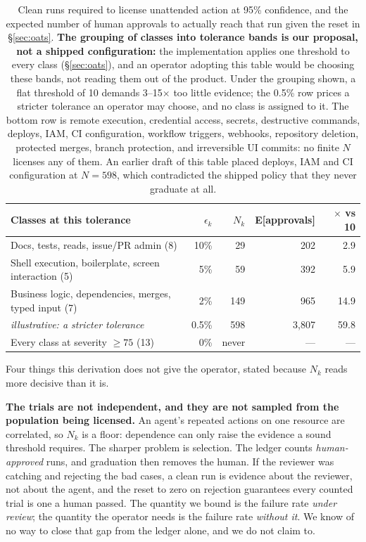 \documentclass[10pt]{article}
\begin{document}
\begin{table}[H]
\centering
\begin{tabular}{lrrrr}
\toprule
Classes at this tolerance & $\epsilon_k$ & $N_k$ & E[approvals] & $\times$ vs 10 \\
\midrule
Docs, tests, reads, issue/PR admin (8) & 10\% & 29 & 202 & 2.9 \\
Shell execution, boilerplate, screen interaction (5) & 5\% & 59 & 392 & 5.9 \\
Business logic, dependencies, merges, typed input (7) & 2\% & 149 & 965 & 14.9 \\
\emph{illustrative: a stricter tolerance} & 0.5\% & 598 & 3{,}807 & 59.8 \\
\midrule
Every class at severity $\geq 75$ (13) & 0\% & never & --- & --- \\
\bottomrule
\end{tabular}
\caption{Clean runs required to license unattended action at 95\% confidence, and the
expected number of human approvals to actually reach that run given the reset in
\S\ref{sec:oats}. \textbf{The grouping of classes into tolerance bands is our
proposal, not a shipped configuration:} the implementation applies one threshold to
every class (\S\ref{sec:oats}), and an operator adopting this table would be choosing
these bands, not reading them out of the product. Under the grouping shown, a flat
threshold of 10 demands 3--15$\times$ too little evidence; the 0.5\% row prices a
stricter tolerance an operator may choose, and no class is assigned to it. The bottom
row is remote execution, credential access, secrets, destructive commands, deploys,
IAM, CI configuration, workflow triggers, webhooks, repository deletion, protected
merges, branch protection, and irreversible UI commits: no finite $N$ licenses any of
them. An earlier draft of this table placed deploys, IAM and CI configuration at
$N=598$, which contradicted the shipped policy that they never graduate at all.}
\end{table}

Four things this derivation does not give the operator, stated because $N_k$ reads
more decisive than it is.

\textbf{The trials are not independent, and they are not sampled from the population
being licensed.} An agent's repeated actions on one resource are correlated, so $N_k$
is a floor: dependence can only raise the evidence a sound threshold requires. The
sharper problem is selection. The ledger counts \emph{human-approved} runs, and
graduation then removes the human. If the reviewer was catching and rejecting the bad
cases, a clean run is evidence about the reviewer, not about the agent, and the reset
to zero on rejection guarantees every counted trial is one a human passed. The
quantity we bound is the failure rate \emph{under review}; the quantity the operator
needs is the failure rate \emph{without it}. We know of no way to close that gap from
the ledger alone, and we do not claim to.
\end{document}
